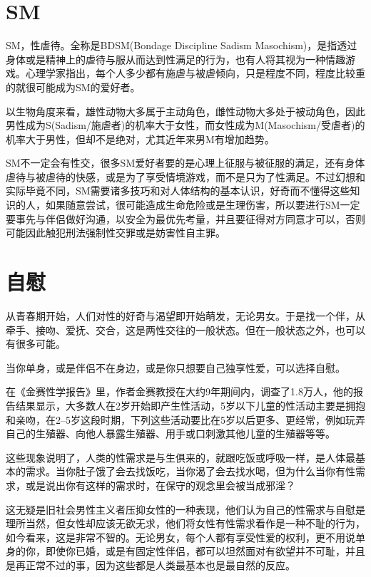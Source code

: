 \documentclass[12pt,UTF8]{ctexbook}
\begin{document}
\chapter{SM}

SM，性虐待。全称是BDSM(Bondage Discipline Sadism Masochism)，是指透过身体或是精神上的虐待与服从而达到性满足的行为，也有人将其视为一种情趣游戏。心理学家指出，每个人多少都有施虐与被虐倾向，只是程度不同，程度比较重的就很可能成为SM的爱好者。

以生物角度来看，雄性动物大多属于主动角色，雌性动物大多处于被动角色，因此男性成为S(Sadism/施虐者)的机率大于女性，而女性成为M(Masochism/受虐者)的机率大于男性，但却不是绝对，尤其近年来男M有增加趋势。

SM不一定会有性交，很多SM爱好者要的是心理上征服与被征服的满足，还有身体虐待与被虐待的快感，或是为了享受情境游戏，而不是只为了性满足。不过幻想和实际毕竟不同，SM需要诸多技巧和对人体结构的基本认识，好奇而不懂得这些知识的人，如果随意尝试，很可能造成生命危险或是生理伤害，所以要进行SM一定要事先与伴侣做好沟通，以安全为最优先考量，并且要征得对方同意才可以，否则可能因此触犯刑法强制性交罪或是妨害性自主罪。

\chapter{自慰}

从青春期开始，人们对性的好奇与渴望即开始萌发，无论男女。于是找一个伴，从牵手、接吻、爱抚、交合，这是两性交往的一般状态。但在一般状态之外，也可以有很多可能。

当你单身，或是伴侣不在身边，或是你只想要自己独享性爱，可以选择自慰。

在《金赛性学报告》里，作者金赛教授在大约9年期间内，调查了1.8万人，他的报告结果显示，大多数人在2岁开始即产生性活动，5岁以下儿童的性活动主要是拥抱和亲吻，在2--5岁这段时期，下列这些活动要比在5岁以后更多、更经常，例如玩弄自己的生殖器、向他人暴露生殖器、用手或口刺激其他儿童的生殖器等等。

这些现象说明了，人类的性需求是与生俱来的，就跟吃饭或呼吸一样，是人体最基本的需求。当你肚子饿了会去找饭吃，当你渴了会去找水喝，但为什么当你有性需求，或是说出你有这样的需求时，在保守的观念里会被当成邪淫？

这无疑是旧社会男性主义者压抑女性的一种表现，他们认为自己的性需求与自慰是理所当然，但女性却应该无欲无求，他们将女性有性需求看作是一种不耻的行为，如今看来，这是非常不智的。无论男女，每个人都有享受性爱的权利，更不用说单身的你，即使你已婚，或是有固定性伴侣，都可以坦然面对有欲望并不可耻，并且是再正常不过的事，因为这些都是人类最基本也是最自然的反应。
\end{document}
